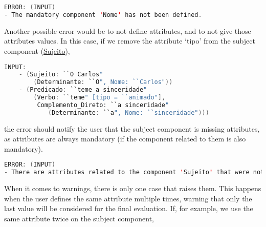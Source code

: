 \begin{center}
\begin{minipage}{13cm}
\begin{lstlisting}[language=java, basicstyle=\small, label={lst:err_msg_missing_comp}, caption=Example error message of missing component]
ERROR: (INPUT) 
- The mandatory component 'Nome' has not been defined.
\end{lstlisting}
\end{minipage}
\end{center}
Another possible error would be to not define attributes, and to not give those attributes values. In this case, if we remove the attribute ‘tipo’ from the subject 
component (\underline{Sujeito}),

\begin{center}
\begin{minipage}{13cm}
\begin{lstlisting}[language=java, basicstyle=\small, label={lst:meta_input_missing_attr}, caption=Example of the students parsing with missing attribute]
INPUT:
    - (Sujeito: ``O Carlos"
        (Determinante: ``O", Nome: ``Carlos"))
    - (Predicado: ``teme a sinceridade" 
        (Verbo: ``teme" [tipo = ``animado"], 
         Complemento_Direto: ``a sinceridade" 
            (Determinante: ``a", Nome: ``sinceridade")))
\end{lstlisting}
\end{minipage}
\end{center}

\noindent the error should notify the user that the subject component is missing attributes, as attributes are always mandatory (if the component related to them is also
mandatory).

\begin{center}
\begin{minipage}{14cm}
\begin{lstlisting}[language=java, basicstyle=\small, label={lst:err_msg_missing_attr}, caption=Example error message of missing attributes]
ERROR: (INPUT)
- There are attributes related to the component 'Sujeito' that were not defined.
\end{lstlisting}
\end{minipage}
\end{center}

When it comes to warnings, there is only one case that raises them. This happens when the user defines the same attribute multiple times, warning that only the last value 
will be considered for the final evaluation. If, for example, we use the same attribute twice on the subject component,

